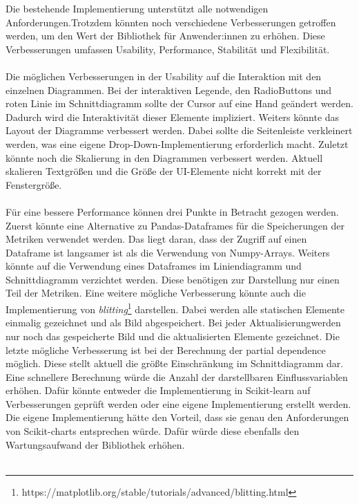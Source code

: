 Die bestehende Implementierung unterstützt alle notwendigen Anforderungen.\linebreak Trotzdem könnten noch verschiedene Verbesserungen getroffen werden, um den Wert der Bibliothek für Anwender:innen zu erhöhen. Diese Verbesserungen umfassen Usability, Performance, Stabilität und Flexibilität.\\\\
\noindent Die möglichen Verbesserungen in der Usability auf die Interaktion mit den einzelnen Diagrammen. Bei der interaktiven Legende, den RadioButtons und roten Linie im Schnittdiagramm sollte der Cursor auf eine Hand geändert werden. Dadurch wird die Interaktivität dieser Elemente impliziert. Weiters könnte das Layout der Diagramme verbessert werden. Dabei sollte die Seitenleiste verkleinert werden, was eine eigene Drop-Down-Implementierung erforderlich macht. Zuletzt könnte noch die Skalierung in den Diagrammen verbessert werden. Aktuell skalieren Textgrößen und die Größe der UI-Elemente nicht korrekt mit der Fenstergröße.\\\\
\noindent Für eine bessere Performance können drei Punkte in Betracht gezogen werden. Zuerst könnte eine Alternative zu Pandas-Dataframes für die Speicherungen der Metriken verwendet werden. Das liegt daran, dass der Zugriff auf einen Dataframe ist langsamer ist als die Verwendung von Numpy-Arrays. Weiters könnte auf die Verwendung eines Dataframes im Liniendiagramm und Schnittdiagramm verzichtet werden. Diese benötigen zur Darstellung nur einen Teil der Metriken. Eine weitere mögliche Verbesserung könnte auch die Implementierung von \emph{blitting}\footnote{https://matplotlib.org/stable/tutorials/advanced/blitting.html} darstellen. Dabei werden alle statischen Elemente einmalig gezeichnet und als Bild abgespeichert. Bei jeder Aktualisierung\linebreak werden nur noch das gespeicherte Bild und die aktualisierten Elemente gezeichnet. Die letzte mögliche Verbesserung ist bei der Berechnung der partial dependence möglich. Diese stellt aktuell die größte Einschränkung im Schnittdiagramm dar. Eine schnellere Berechnung würde die Anzahl der darstellbaren Einflussvariablen erhöhen. Dafür könnte entweder die Implementierung in Scikit-learn auf Verbesserungen geprüft werden oder eine eigene Implementierung erstellt werden. Die eigene Implementierung hätte den Vorteil, dass sie genau den Anforderungen von Scikit-charts entsprechen würde. Dafür würde diese ebenfalls den Wartungsaufwand der Bibliothek erhöhen.\\\\

